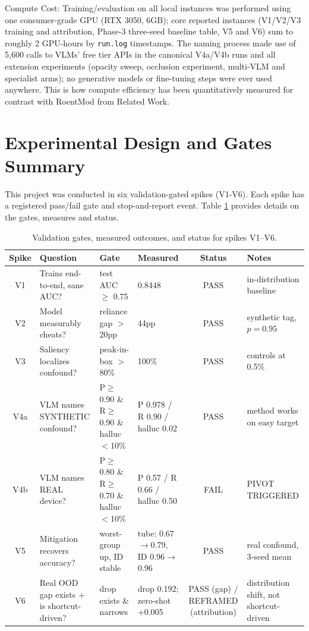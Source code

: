 \documentclass{ieeeaccess}
\begin{document}
Compute Cost: Training/evaluation on all local instances was performed using one consumer-grade GPU
(RTX 3050, 6GB); core reported instances (V1/V2/V3 training and attribution,
Phase-3 three-seed baseline table, V5 and V6) sum to roughly 2 GPU-hours by
\texttt{run.log} timestamps. The naming process made use of 5,600 calls to
VLMs' free tier APIs in the canonical V4a/V4b runs and all extension
experiments (opacity sweep, occlusion experiment, multi-VLM and specialist
arms); no generative models or fine-tuning steps were ever used anywhere.
This is how compute efficiency has been quantitatively measured for contrast
with RoentMod from Related Work.

\section{Experimental Design and Gates Summary}
\label{sec:gates}
This project was conducted in six validation-gated spikes (V1-V6). Each spike has a registered pass/fail gate and stop-and-report event. Table \ref{tab:gates} provides details on the gates, measures and status.

\begin{table}[t]
\caption{Validation gates, measured outcomes, and status for spikes V1--V6.}
\label{tab:gates}
\centering
\small
\begin{tabular}{|c|p{95pt}|p{110pt}|p{85pt}|c|p{100pt}|}
\hline
Spike & Question & Gate & Measured & Status & Notes \\
\hline
V1 & Trains end-to-end, sane AUC? & test AUC $\geq$ 0.75 & 0.8448 & PASS &
in-distribution baseline \\
\hline
V2 & Model measurably cheats? & reliance gap $>$20pp & 44pp & PASS &
synthetic tag, $p=0.95$ \\
\hline
V3 & Saliency localizes confound? & peak-in-box $>$80\% & 100\% & PASS &
controls at 0.5\% \\
\hline
V4a & VLM names SYNTHETIC confound? & P$\geq$0.90 \& R$\geq$0.90 \&
halluc$<$10\% & P 0.978 / R 0.90 / halluc 0.02 & PASS & method works on easy
target \\
\hline
V4b & VLM names REAL device? & P$\geq$0.80 \& R$\geq$0.70 \& halluc$<$10\% &
P 0.57 / R 0.66 / halluc 0.50 & FAIL & PIVOT TRIGGERED \\
\hline
V5 & Mitigation recovers accuracy? & worst-group up, ID stable & tube:
0.67$\rightarrow$0.79, ID 0.96$\rightarrow$0.96 & PASS & real confound,
3-seed mean \\
\hline
V6 & Real OOD gap exists + is shortcut-driven? & drop exists \& narrows &
drop 0.192; zero-shot +0.005 & PASS (gap) / REFRAMED (attribution) &
distribution shift, not shortcut-driven \\
\hline
\end{tabular}
\end{table}
\end{document}
